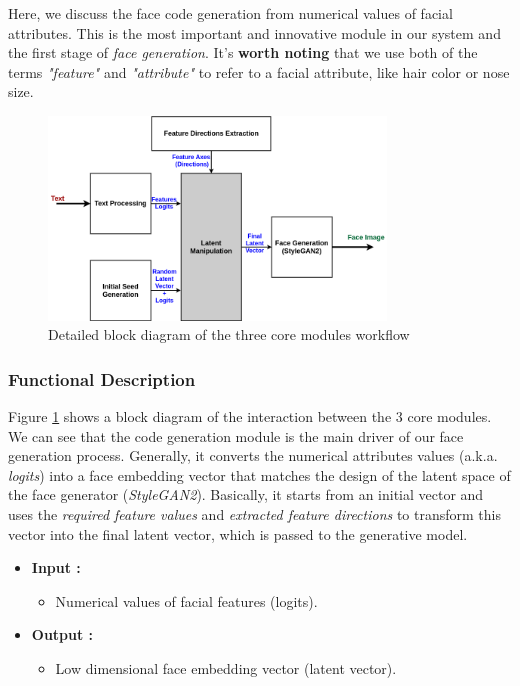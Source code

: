 Here, we discuss the face code generation from numerical values of facial attributes. This is the most important and innovative module in our system and the first stage of \emph{face generation}. It's \textbf{worth noting} that we use both of the terms \emph{"feature"} and \emph{"attribute"} to refer to a facial attribute, like hair color or nose size.

\begin{figure}[H]
    \centering
    \includegraphics[width=0.8\textwidth]{images/face-gen-arch.png}
    \caption{Detailed block diagram of the three core modules workflow}
    \label{fig:face_gen}
\end{figure}

\subsubsection{Functional Description}

Figure \ref{fig:face_gen} shows a block diagram of the interaction between the $3$ core modules. We can see that the code generation module is the main driver of our face generation process. Generally, it converts the numerical attributes values (a.k.a. \emph{logits}) into a face embedding vector that matches the design of the latent space of the face generator (\emph{StyleGAN2}). Basically, it starts from an initial vector and uses the \emph{required feature values} and \emph{extracted feature directions} to transform this vector into the final latent vector, which is passed to the generative model.

\begin{itemize}
    \item \textbf{Input :}
    \begin{itemize}
        \item Numerical values of facial features (logits).
    \end{itemize}
    \item \textbf{Output :}
    \begin{itemize}
        \item Low dimensional face embedding vector (latent vector).
    \end{itemize}
\end{itemize}

